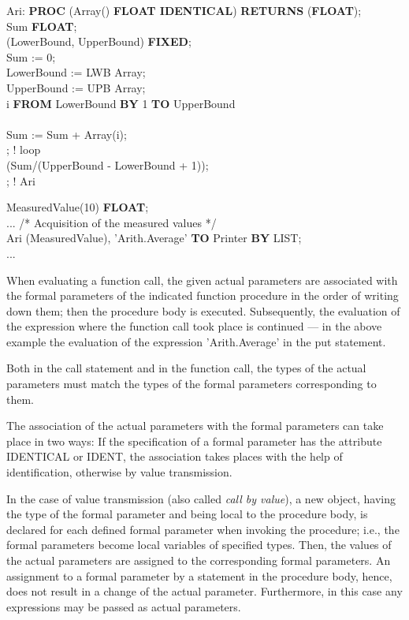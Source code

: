 Ari: {\bf PROC} (Array() {\bf FLOAT IDENTICAL}) {\bf RETURNS} ({\bf FLOAT});\\
\x {} Sum {\bf FLOAT};\\
\x {} (LowerBound, UpperBound) {\bf FIXED};\\
\x \x Sum := 0;\\
\x \x LowerBound := LWB Array; \\
\x \x UpperBound := UPB Array; \\
\x {} i {\bf FROM} LowerBound {\bf BY} 1 {\bf TO} UpperBound\\
\x {}\\
\x \x \x Sum := Sum + Array(i);\\
\x {}; ! loop\\
\x {} (Sum/(UpperBound - LowerBound + 1));\\
; ! Ari

 MeasuredValue(10) {\bf FLOAT};\\
\x ...
\x \x /* Acquisition of the measured values */ \\
 Ari (MeasuredValue), 'Arith.Average' {\bf TO} Printer {\bf BY} LIST;\\
\x ...

When evaluating a function call, the given actual parameters are
associated with the formal parameters of the indicated function
procedure in the order of writing down them; then the procedure body is
executed. Subsequently, the evaluation of the expression where the
function call took place is continued --- in the above example the
evaluation of the expression 'Arith.Average' in the put statement.

Both in the call statement and in the function call, the types of the
actual parameters must match the types of the formal parameters
corresponding to them.

The association of the actual parameters with the formal parameters can
take place in two ways: If the specification of a formal parameter has
the attribute IDENTICAL or IDENT, the association takes places with the
help of identification, otherwise by value transmission.

In the case of value transmission (also called {\em call by value}), a
new object, having the type of the formal parameter and being local to
the procedure body, is declared for each defined formal parameter when
invoking the procedure; i.e., the formal parameters become local
variables of specified types. Then, the values of the actual parameters
are assigned to the corresponding formal parameters. An assignment to a
formal parameter by a statement in the procedure body, hence, does not
result in a change of the actual parameter. Furthermore, in this case
any expressions may be passed as actual parameters.

